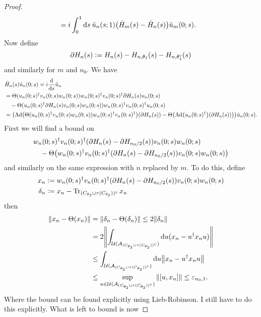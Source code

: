 \documentclass[12pt,a4paper,twoside]{article}
\renewcommand{\d}{\text{d}}
\newcommand{\defeq}{\vcentcolon=}
\let\originalleft\left
\let\originalright\right
\renewcommand{\left}{\mathopen{}\mathclose\bgroup\originalleft}
\renewcommand{\right}{\aftergroup\egroup\originalright}
\newcommand{\UU}{\mathcal U}
\renewcommand{\AA}{\mathcal A}
\newcommand{\Ad}[1]{\textrm{Ad}\left(#1\right)}
\theoremstyle{definition}
\numberwithin{equation}{section}
\begin{document}
\begin{proof}
\begin{align}
		&=i\int_0^1\d s \: \tilde{u}_n(s;1)\left(\tilde{H}_m(s)-\tilde{H}_n(s)\right)\tilde{u}_m(0;s).
	\end{align}
	Now define
	\begin{equation}
		\partial H_n(s)\defeq H_n(s)-H_{n,\theta_1}(s)-H_{n,\theta_1^c}(s)
	\end{equation}
	and similarly for $m$ and $n_0$. We have
	\begin{align}
		&\tilde{H}_n(s)\tilde{u}_n(0;s)=i\frac{\d}{\d s}\tilde{u}_n\\
		&=\Theta(u_n(0;s)^\dagger v_n(0;s)w_n(0;s))w_n(0;s)^\dagger v_n(0;s)^\dagger \partial H_n(s) u_n(0;s)\\
		\nonumber
		&\quad-\Theta(u_n(0;s)^\dagger \partial H_n(s) v_n(0;s)w_n(0;s))w_n(0;s)^\dagger v_n(0;s)^\dagger u_n(0;s)\\
		&=\left(\Ad{\Theta(u_n(0;s)^\dagger v_n(0;s)w_n(0;s))w_n(0;s)^\dagger v_n(0;s)^\dagger}(\partial H_n(s))-\Theta\left(\Ad{u_n(0;s)^\dagger}(\partial H_n(s))\right)\right)\tilde{u}_n(0;s).
	\end{align}
	First we will find a bound on
	\begin{align}
		&w_n(0;s)^\dagger v_n(0;s)^\dagger(\partial H_n(s)-\partial H_{n_0/2}(s))v_n(0;s)w_n(0;s)\\
	\nonumber
		&\quad-\Theta\left(w_n(0;s)^\dagger v_n(0;s)^\dagger(\partial H_n(s)-\partial H_{n_0/2}(s))v_n(0;s)w_n(0;s)\right)
	\end{align}
	and similarly on the same expression with $n$ replaced by $m$. To do this, define
	\begin{align}
		x_n&\defeq w_n(0;s)^\dagger v_n(0;s)^\dagger(\partial H_n(s)-\partial H_{n_0/2}(s))v_n(0;s)w_n(0;s)\\
		\delta_n&\defeq x_n-\Tr_{(C_{\theta_2}\cup \tau(C_{\theta_2}))^c}x_n
	\end{align}
	then
	\begin{align}
		\norm{x_n-\Theta(x_n)}&=\norm{\delta_n-\Theta(\delta_n)}\leq 2\norm{\delta_n}\\
		&=2\norm{\int_{\UU(\AA_{(C_{\theta_2}\cup \tau(C_{\theta_2}))^c})}\d u (x_n-u^\dagger x_n u)}\\
		&\leq \int_{\UU(\AA_{(C_{\theta_2}\cup \tau(C_{\theta_2}))^c})}\d u \norm{x_n-u^\dagger x_n u}\\
		&\leq \sup_{u\in\UU(\AA_{(C_{\theta_2}\cup \tau(C_{\theta_2}))^c})}\norm{[u,x_n]}\leq \varepsilon_{n_0,1}.
	\end{align}
	Where the bound can be found explicitly using Lieb-Robinson. {\color{red}I still have to do this explicitly. }What is left to bound is now

\end{proof}
\end{document}
